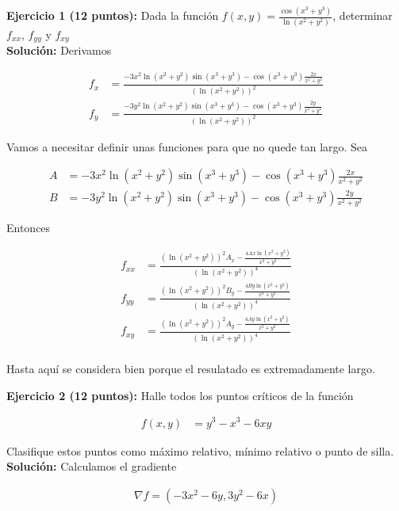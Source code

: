 \documentclass[a4paper]{article}
\begin{document}
\setlength{\parindent}{0cm}

\textbf{Ejercicio 1 (12 puntos):} Dada la función $f(x,y)= \frac{\cos(x^3+y^3)}{\ln(x^2+y^2)}$, determinar $f_{xx}$, $f_{yy}$ y $f_{xy}$ \\


\textbf{Solución: }Derivamos

\begin{align*}
    f_x &= \frac{-3x^2\ln(x^2+y^2)\sin(x^3+y^3)-\cos(x^3+y^3)\frac{2x}{x^2+y^2}}{(\ln(x^2+y^2))^2} \\
    f_y &= \frac{-3y^2\ln(x^2+y^2)\sin(x^3+y^3)-\cos(x^3+y^3)\frac{2y}{x^2+y^2}}{(\ln(x^2+y^2))^2}
\end{align*}

Vamos a necesitar definir unas funciones para que no quede tan largo. Sea

\begin{align*}
    A &= -3x^2\ln(x^2+y^2)\sin(x^3+y^3)-\cos(x^3+y^3)\frac{2x}{x^2+y^2} \\
    B &= -3y^2\ln(x^2+y^2)\sin(x^3+y^3)-\cos(x^3+y^3)\frac{2y}{x^2+y^2}
\end{align*}

Entonces

\begin{align*}
    f_{xx} &= \frac{(\ln(x^2+y^2))^2A_x- \frac{4Ax\ln(x^2+y^2)}{x^2+y^2}}{(\ln(x^2+y^2))^4} \\
   f_{yy} &= \frac{(\ln(x^2+y^2))^2B_y- \frac{4By\ln(x^2+y^2)}{x^2+y^2}}{(\ln(x^2+y^2))^4} \\
   f_{xy} &= \frac{(\ln(x^2+y^2))^2A_y- \frac{4Ay\ln(x^2+y^2)}{x^2+y^2}}{(\ln(x^2+y^2))^4} \\
\end{align*}

Hasta aquí se considera bien porque el resulatado es extremadamente largo.


\newpage


\textbf{Ejercicio 2 (12 puntos):} Halle todos los puntos críticos de la función 

\begin{align*}
    f(x,y) &= y^3-x^3-6xy
\end{align*}

Clasifique estos puntos como máximo relativo, mínimo relativo o punto de silla. \\

\textbf{Solución: } Calculamos el gradiente

\begin{align*}
    \nabla f = (-3x^2-6y, 3y^2-6x)
\end{align*}
\end{document}
